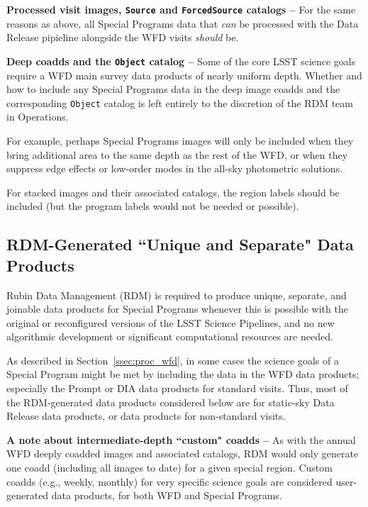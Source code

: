 \textbf{Processed visit images, {\tt Source} and {\tt ForcedSource} catalogs -- }
For the same reasons as above, all Special Programs data that 
{\it can} be processed with the Data Release pipieline alongside the WFD 
visits {\it should} be.

\textbf{Deep coadds and the {\tt Object} catalog -- }
Some of the core LSST science goals require a WFD main survey data 
products of nearly uniform depth.
Whether and how to include any Special Programs data in the deep image 
coadds and the corresponding {\tt Object} catalog is left entirely to the 
discretion of the RDM team in Operations.

For example, perhaps Special Programs images will only be included when 
they bring additional area to the same depth as the rest of the WFD, or 
when they suppress edge effects or low-order modes in the 
all-sky photometric solutions.

For stacked images and their associated catalogs, the region labels should be
included (but the program labels would not be needed or possible).


\subsection{RDM-Generated ``Unique and Separate" Data Products}\label{ssec:proc_rdm}

Rubin Data Management (RDM) is required to produce unique, separate, and 
joinable data products for Special Programs whenever this is possible with the 
original or reconfigured versions of the LSST Science Pipelines, and no new 
algorithmic development or significant computational resources are needed.

As described in Section~\ref{ssec:proc_wfd}, in some cases the science goals 
of a Special Program might be met by including the data in the WFD data 
products; especially the Prompt or DIA data products for standard visits.
Thus, most of the RDM-generated data products considered below are for 
static-sky Data Release data products, or data products for non-standard visits.

\textbf{A note about intermediate-depth ``custom" coadds -- }
As with the annual WFD deeply coadded images and associated catalogs, RDM would 
only generate one coadd (including all images to date) for a given special region.
Custom coadds (e.g., weekly, monthly) for very specific science goals are considered 
user-generated data products, for both WFD and Special Programs.

